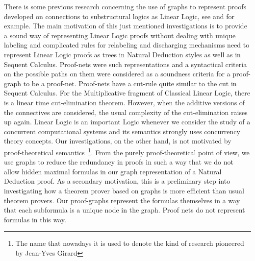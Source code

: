 \documentclass[submission,copyright,creativecommons]{eptcs}
\begin{document}
There is some previous research concerning the use of graphs to represent proofs 
developed on connections to substructural logics as Linear Logic, see \cite{Girard1} 
and \cite{Girard2} for example. The main motivation of this just mentioned 
investigations is to provide a sound way of representing Linear Logic proofs without 
dealing with unique labeling and complicated rules for relabeling and discharging 
mechanisms need to represent Linear Logic proofs as trees in Natural Deduction styles 
as well as in Sequent Calculus. 
Proof-nets were such representations and a syntactical criteria on the possible paths 
on them were considered as a soundness criteria for a proof-graph to be a proof-net. 
Proof-nets have a cut-rule quite similar to the cut in Sequent Calculus. 
For the Multiplicative fragment of Classical Linear Logic, there is a linear time 
cut-elimination theorem. However, when the additive versions of the connectives are 
considered, the usual complexity of the cut-elimination raises up again. Linear Logic 
is an important Logic whenever we consider the study of a concurrent computational 
systems and its semantics strongly uses concurrency theory concepts. Our investigations, 
on the other hand, is not motivated by proof-theoretical semantics~\footnote{The name that nowadays it is used to denote the kind of research pioneered by Jean-Yves Girard}. 
From the purely proof-theoretical point of view, we use graphs to reduce the redundancy 
in proofs in such a way that we do not allow hidden maximal formulas in our graph 
representation of a Natural Deduction proof. As a secondary motivation, this is a 
preliminary step into investigating how a theorem prover based on graphs is more 
efficient than usual theorem provers. Our proof-graphs represent the formulas 
themselves in a way that each subformula is a unique node in the graph. 
Proof nets do not represent formulas in this way.

 



\end{document}
